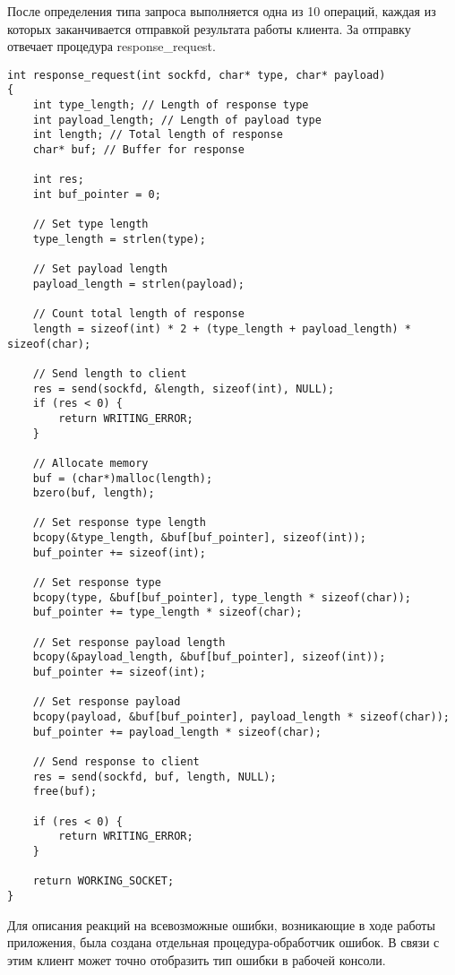 После определения типа запроса выполняется одна из 10 операций, каждая из которых заканчивается отправкой результата работы клиента. За отправку отвечает процедура response\_request.

\begin{lstlisting}
int response_request(int sockfd, char* type, char* payload)
{
	int type_length; // Length of response type
	int payload_length; // Length of payload type
	int length; // Total length of response
	char* buf; // Buffer for response

	int res;
	int buf_pointer = 0;

	// Set type length
	type_length = strlen(type);

	// Set payload length
	payload_length = strlen(payload);

	// Count total length of response
	length = sizeof(int) * 2 + (type_length + payload_length) * sizeof(char);

	// Send length to client
	res = send(sockfd, &length, sizeof(int), NULL);
	if (res < 0) {
		return WRITING_ERROR;
	}

	// Allocate memory
	buf = (char*)malloc(length);
	bzero(buf, length);

	// Set response type length
	bcopy(&type_length, &buf[buf_pointer], sizeof(int));
	buf_pointer += sizeof(int);

	// Set response type
	bcopy(type, &buf[buf_pointer], type_length * sizeof(char));
	buf_pointer += type_length * sizeof(char);

	// Set response payload length
	bcopy(&payload_length, &buf[buf_pointer], sizeof(int));
	buf_pointer += sizeof(int);

	// Set response payload
	bcopy(payload, &buf[buf_pointer], payload_length * sizeof(char));
	buf_pointer += payload_length * sizeof(char);

	// Send response to client
	res = send(sockfd, buf, length, NULL);
	free(buf);

	if (res < 0) {
		return WRITING_ERROR;
	}

	return WORKING_SOCKET;
}
\end{lstlisting}

Для описания реакций на всевозможные ошибки, возникающие в ходе работы приложения, была создана отдельная процедура-обработчик ошибок. В связи с этим клиент может точно отобразить тип ошибки в рабочей консоли.

